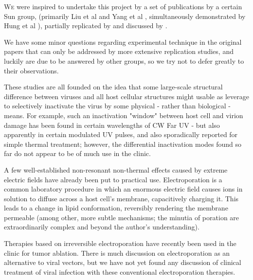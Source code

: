 \documentclass[paper.tex]{subfiles}
\begin{document}

\begin{multicols}{1}

\lettrine{W}e were inspired to undertake this project by a set of publications by a certain Sun group, (primarily Liu et al \cite{Microwave2009} and Yang et al \cite{Efficient2015}, simultaneously demonstrated by Hung et al \cite{focusing2014}), partially replicated by \cite{Optical2020} and discussed by \cite{Theoretical2020}.

We have some minor questions regarding experimental technique in the original papers that can only be addressed by more extensive replication studies, and luckily are due to be answered by other groups\cite{Generating}, so we try not to defer greatly to their observations. 

These studies are all founded on the idea that some large-scale structural difference between viruses and all host cellular structures might usable as leverage to selectively inactivate the virus by some physical - rather than biological - means. For example, such an inactivation "window" between host cell and virion damage has been found in certain wavelengths of CW Far UV\cite{Germicidal2017} - but also apparently in certain modulated UV pulses\cite{Use1987a}\cite{Can1993}, and also sporadically reported for simple thermal treatment\cite{Summary}; however, the differential inactivation modes found so far do not appear to be of much use in the clinic.

A few well-established non-resonant non-thermal effects caused by extreme electric fields have already been put to practical use. Electroporation\cite{Electroporation1988} is a common laboratory procedure in which an enormous electric field causes ions in solution to diffuse across a host cell's membrane, capacitively charging it. This leads to a change in lipid conformation, reversibly rendering the membrane permeable (among other, more subtle mechanisms; the minutia of poration are extraordinarily complex and beyond the author's understanding\cite{Theoretical2007}). 

Therapies based on irreversible electroporation\cite{Nonthermal2013}\cite{Lipid2017} have recently been used in the clinic\cite{Irreversible2013} for tumor ablation. There is much discussion on electroporation as an alternative to viral vectors, but we have not yet found any discussion of clinical treatment of viral infection with these conventional electroporation therapies.%


\end{multicols}
\end{document}
